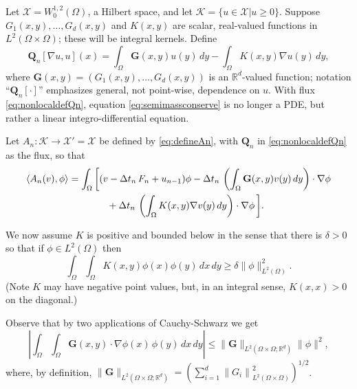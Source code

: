 \documentclass[final,leqno,onefignum,onetabnum]{siamltex1213bueler}
\newcommand\bG{\mathbf{G}}
\newcommand\bQ{\mathbf{Q}}
\renewcommand{\grad}{\nabla}
\newcommand{\ip}[2]{\ensuremath{\left<#1,#2\right>}}
\newcommand\RR{\mathbb{R}}
\begin{document}
Let $\mathcal{X} = W_0^{1,2}(\Omega)$, a Hilbert space, and let $\mathcal{K}=\{u\in\mathcal{X}|u\ge 0\}$.  Suppose $G_1(x,y), \dots, G_d(x,y)$ and $K(x,y)$ are scalar, real-valued functions in $L^2(\Omega\times \Omega)$; these will be integral kernels.  Define
\begin{equation}
\bQ_n[\grad u,u](x) = \int_\Omega \bG(x,y) u(y)\,dy - \int_\Omega K(x,y) \grad u(y)\,dy, \label{eq:nonlocaldefQn}
\end{equation}
where $\bG(x,y) = (G_1(x,y), \dots, G_d(x,y))$ is an $\RR^d$-valued function; notation ``$\bQ_n[\cdot]$'' emphasizes general, not point-wise, dependence on $u$.  With flux \eqref{eq:nonlocaldefQn}, equation \eqref{eq:semimassconserve} is no longer a PDE, but rather a linear integro-differential equation.

Let $A_n:\mathcal{K} \to \mathcal{X}'=\mathcal{X}$ be defined by \eqref{eq:defineAn}, with $\bQ_n$ in \eqref{eq:nonlocaldefQn} as the flux, so that
\begin{align}
    \ip{A_n(v)}{\phi} &= \int_\Omega \bigg[(v - \Delta t_n\,F_n + u_{n-1})\phi - \Delta t_n\,\left(\int_\Omega \bG(x,y) v(y)\,dy\right)\cdot \grad \phi \label{eq:nonlocaldefnAn} \\
                      &\qquad\qquad + \Delta t_n\,\left(\int_\Omega K(x,y) \grad v(y)\,dy\right)\cdot \grad \phi\,\bigg]. \notag
\end{align}

We now assume $K$ is positive and bounded below \cite{PorterStirling1990} in the sense that there is $\delta>0$ so that if $\phi \in L^2(\Omega)$ then
\begin{equation}
   \int_\Omega \int_\Omega K(x,y) \phi(x) \phi(y)\,dx\,dy \ge \delta \|\phi\|_{L^2(\Omega)}^2.  \label{eq:nonlocalKpos}
\end{equation}
(Note $K$ may have negative point values, but, in an integral sense, $K(x,x)>0$ on the diagonal.)

Observe that by two applications of Cauchy-Schwarz we get
\begin{equation}
\left|\int_\Omega \int_\Omega \bG(x,y) \cdot \grad \phi(x)\,\phi(y) \,dx\,dy\right|
  \le \|\bG\|_{L^2(\Omega\times\Omega;\RR^d)} \|\phi\|^2,   \label{eq:nonlocalGbound}
\end{equation}
where, by definition, $\|\bG\|_{L^2(\Omega\times\Omega;\RR^d)} = \left(\sum_{i=1}^d \left\|G_i\right\|_{L^2(\Omega \times \Omega)}^2\right)^{1/2}$.
\end{document}
